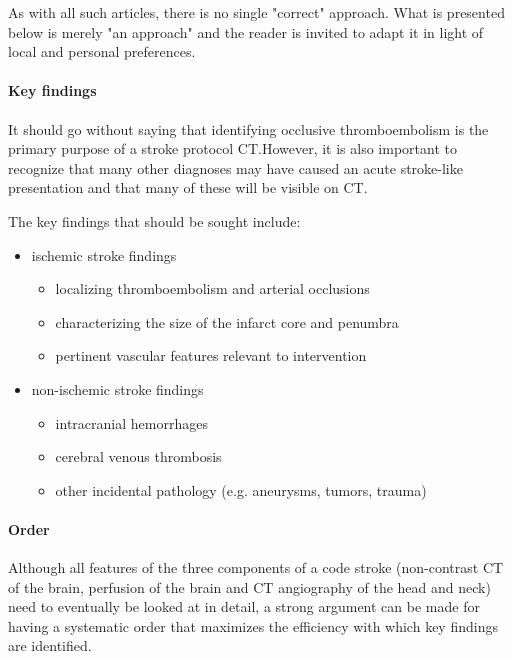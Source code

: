 As with all such articles, there is no single "correct" approach. What is presented below is merely "an approach" and the reader is invited to adapt it in light of local and personal preferences.

\paragraph{Key findings}

It should go without saying that identifying occlusive thromboembolism is the primary purpose of a stroke protocol CT.However, it is also important to recognize that many other diagnoses may have caused an acute stroke-like presentation and that many of these will be visible on CT.

The key findings that should be sought include:

\begin{itemize}
	\item
	ischemic stroke findings
	
	\begin{itemize}
		\item
		localizing thromboembolism and arterial occlusions
		\item
		characterizing the size of the infarct core and penumbra
		\item
		pertinent vascular features relevant to intervention
	\end{itemize}
	\item
	non-ischemic stroke findings
	
	\begin{itemize}
		\item
		intracranial hemorrhages
		\item
		cerebral venous thrombosis
		\item
		other incidental pathology (e.g. aneurysms, tumors, trauma)
	\end{itemize}
\end{itemize}

\paragraph{Order}

Although all features of the three components of a code stroke (non-contrast CT of the brain, perfusion of the brain and CT angiography of the head and neck) need to eventually be looked at in detail, a strong argument can be made for having a systematic order that maximizes the efficiency with which key findings are identified.

